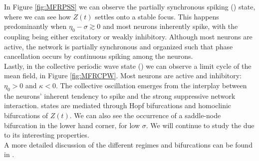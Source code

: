 In Figure \ref{fig:MFRPSS} we can observe the partially synchronous spiking (\PSS) state, where we can see how $Z(t)$ settles onto a stable focus. This happens predominantly when $\eta_0 - \sigma \gtrsim 0$ and most neurons inherently spike, with the coupling being either excitatory or weakly inhibitory. Although most neurons are active, the network is partially synchronous and organized such that phase cancellation occurs by continuous spiking among the neurons.\\

Lastly, in the collective periodic wave state (\CPW) we can observe a limit cycle of the mean field, in Figure \ref{fig:MFRCPW}. Most neurons are active and inhibitory: $\eta_0 > 0$ and $\kappa < 0$. The collective oscillation emerges from the interplay between the neurons’ inherent tendency to spike and the strong suppressive network interaction. \CPW states are mediated through Hopf bifurcations and homoclinic bifurcations of $Z(t)$. We can also see the occurrence of a saddle-node bifurcation in the lower hand corner, for low $\sigma$. We will continue to study the \CPW due to its interesting properties.\\

A more detailed discussion of the different regimes and bifurcations can be found in \cite{Luke2013}.


